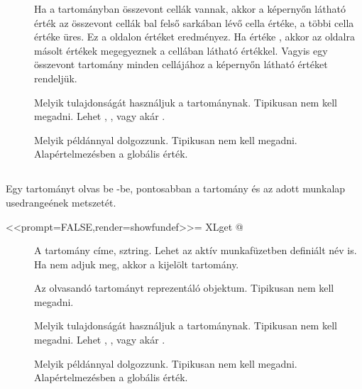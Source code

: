 \begin{description}
\item[] Ha a tartományban összevont cellák vannak,
  akkor a képernyőn látható érték az összevont cellák bal felső
  sarkában lévő cella értéke, a többi cella értéke üres. Ez a  
  oldalon  értéket eredményez. Ha  értéke
  , akkor az  oldalra másolt 
  értékek megegyeznek a cellában látható értékkel. Vagyis egy
  összevont tartomány minden cellájához a képernyőn látható értéket
  rendeljük. 
\item[] Melyik tulajdonságát használjuk a
  tartománynak. Tipikusan nem kell megadni. Lehet 
  , ,  vagy akár
  . 
\item[] Melyik  példánnyal dolgozzunk. Tipikusan nem
  kell megadni. Alapértelmezésben a globális  érték.
\end{description}

\subsection{}
Egy  tartományt olvas be -be, pontosabban a tartomány és az
adott munkalap usedrangeének metszetét. 
\begin{Rnw}
<<prompt=FALSE,render=showfundef>>=
XLget
@  
\end{Rnw}
\begin{description}
\item[] A tartomány címe, sztring. Lehet az aktív
  munkafüzetben definiált név is. Ha nem adjuk meg, akkor a kijelölt tartomány.
\item[] Az olvasandó tartományt reprezentáló 
  objektum. Tipikusan nem kell megadni. 
\item[] Melyik tulajdonságát használjuk a
  tartománynak. Tipikusan nem kell megadni. Lehet 
  , ,  vagy akár .
\item[] Melyik  példánnyal dolgozzunk. Tipikusan nem
  kell megadni. Alapértelmezésben a globális  érték.
\end{description}

